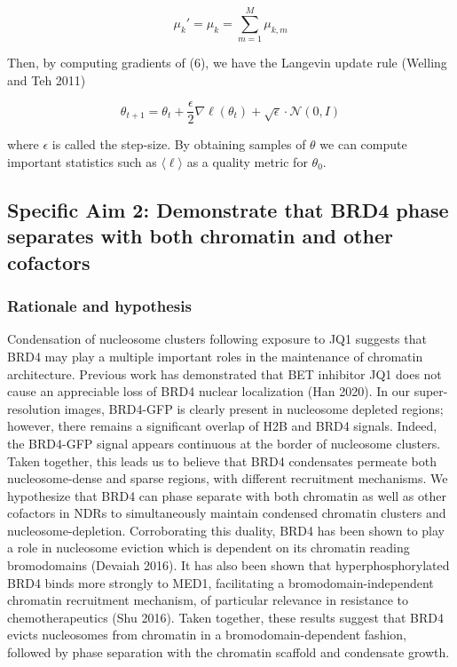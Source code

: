 \documentclass{ucetd}
\begin{document}
\begin{equation*}
\mu_{k}' = \mu_{k} = \sum_{m=1}^{M} \mu_{k,m}
\end{equation*}

Then, by computing gradients of (6), we have the Langevin update rule (Welling and Teh 2011)

\[ \theta_{t+1} = \theta_t + \frac{\epsilon}{2} \nabla \ell(\theta_t) + \sqrt{\epsilon} \cdot \mathcal{N}(0, I) \]

where $\epsilon$ is called the step-size. By obtaining samples of $\theta$ we can compute important statistics such as $\langle \ell \rangle$ as a quality metric for $\theta_{0}$.

\subsection{Specific Aim 2: Demonstrate that BRD4 phase separates with both chromatin and other cofactors}

\subsubsection{Rationale and hypothesis}

Condensation of nucleosome clusters following exposure to JQ1 suggests that BRD4 may play a multiple important roles in the maintenance of chromatin architecture. Previous work has demonstrated that BET inhibitor JQ1 does not cause an appreciable loss of BRD4 nuclear localization (Han 2020). In our super-resolution images, BRD4-GFP is clearly present in nucleosome depleted regions; however, there remains a significant overlap of H2B and BRD4 signals. Indeed, the BRD4-GFP signal appears continuous at the border of nucleosome clusters. Taken together, this leads us to believe that BRD4 condensates permeate both nucleosome-dense and sparse regions, with different recruitment mechanisms. We hypothesize that BRD4 can phase separate with both chromatin as well as other cofactors in NDRs to simultaneously maintain condensed chromatin clusters and nucleosome-depletion. Corroborating this duality, BRD4 has been shown to play a role in nucleosome eviction which is dependent on its chromatin reading bromodomains (Devaiah 2016). It has also been shown that hyperphosphorylated BRD4 binds more strongly to MED1, facilitating a bromodomain-independent chromatin recruitment mechanism, of particular relevance in resistance to chemotherapeutics (Shu 2016). Taken together, these results suggest that BRD4 evicts nucleosomes from chromatin in a bromodomain-dependent fashion, followed by phase separation with the chromatin scaffold and condensate growth.
\end{document}
